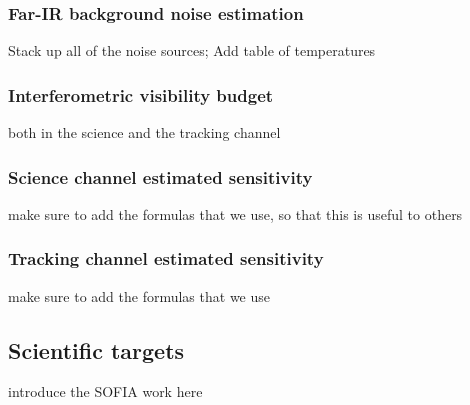 \subsubsection{Far-IR background noise estimation}
Stack up all of the noise sources; Add table of temperatures
\subsubsection{Interferometric visibility budget}
both in the science and the tracking channel
\subsubsection{Science channel estimated sensitivity}
make sure to add the formulas that we use, so that this is useful to others

\subsubsection{Tracking channel estimated sensitivity}
make sure to add the formulas that we use

\subsection{Scientific targets}

introduce the SOFIA work here

